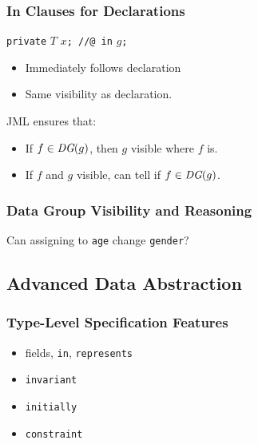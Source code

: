 \begin{frame}[fragile]
\frametitle{In Clauses for Declarations}

\lstinline!private! $T$ $x$\lstinline!; //@ in! $g$\texttt{;}

\begin{itemize}
\item
Immediately follows declaration

\item
Same visibility as declaration.
\end{itemize}

JML ensures that:
\begin{itemize}
\item
If $f \in \textit{DG}(g)$, then $g$ visible where $f$ is.

\item
If $f$ and $g$ visible,
can tell if $f \in \textit{DG}(g)$.
\end{itemize}
\end{frame}

\begin{frame}[fragile]
\frametitle{Data Group Visibility and Reasoning}

\begin{question}
Can assigning to \lstinline!age! change \lstinline!gender!?
\end{question}
\end{frame}

\subsection[Advanced]{Advanced Data Abstraction}

\begin{frame}[fragile]
\frametitle{Type-Level Specification Features}

\begin{itemize}
\item
fields, \lstinline!in!, \lstinline!represents!

\item
\lstinline!invariant!

\item
\lstinline!initially!

\item
\lstinline!constraint!
\end{itemize}
\end{frame}

